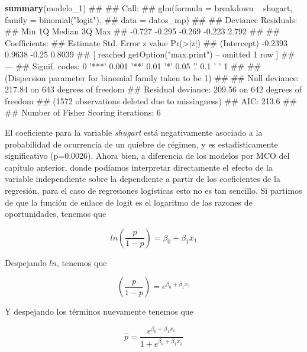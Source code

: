 \documentclass[]{book}
\newenvironment{Shaded}{\begin{snugshade}}{\end{snugshade}}
\newcommand{\KeywordTok}[1]{\textcolor[rgb]{0.13,0.29,0.53}{\textbf{#1}}}
\newcommand{\DecValTok}[1]{\textcolor[rgb]{0.00,0.00,0.81}{#1}}
\newcommand{\NormalTok}[1]{#1}
\begin{document}
\begin{Shaded}
\begin{Highlighting}[]
\KeywordTok{summary}\NormalTok{(modelo_}\DecValTok{1}\NormalTok{)}
\NormalTok{## }
\NormalTok{## Call:}
\NormalTok{## glm(formula = breakdown ~ shugart, family = binomial("logit"), }
\NormalTok{##     data = datos_mp)}
\NormalTok{## }
\NormalTok{## Deviance Residuals: }
\NormalTok{##    Min      1Q  Median      3Q     Max  }
\NormalTok{## -0.727  -0.295  -0.269  -0.223   2.792  }
\NormalTok{## }
\NormalTok{## Coefficients:}
\NormalTok{##             Estimate Std. Error z value Pr(>|z|)   }
\NormalTok{## (Intercept)  -0.2393     0.9638   -0.25   0.8039   }
\NormalTok{##  [ reached getOption("max.print") -- omitted 1 row ]}
\NormalTok{## ---}
\NormalTok{## Signif. codes:  0 '***' 0.001 '**' 0.01 '*' 0.05 '.' 0.1 ' ' 1}
\NormalTok{## }
\NormalTok{## (Dispersion parameter for binomial family taken to be 1)}
\NormalTok{## }
\NormalTok{##     Null deviance: 217.84  on 643  degrees of freedom}
\NormalTok{## Residual deviance: 209.56  on 642  degrees of freedom}
\NormalTok{##   (1572 observations deleted due to missingness)}
\NormalTok{## AIC: 213.6}
\NormalTok{## }
\NormalTok{## Number of Fisher Scoring iterations: 6}
\end{Highlighting}
\end{Shaded}

El coeficiente para la variable \emph{shugart} está negativamente
asociado a la probabilidad de ocurrencia de un quiebre de régimen, y es
estadísticamente significativo (p=0.0026). Ahora bien, a diferencia de
los modelos por MCO del capítulo anterior, donde podíamos interpretar
directamente el efecto de la variable independiente sobre la dependiente
a partir de los coeficientes de la regresión, para el caso de
regresiones logísticas esto no es tan sencillo. Si partimos de que la
función de enlace de logit es el logaritmo de las razones de
oportunidades, tenemos que

\[ln(\frac {p}{1 - p}) = \beta_{0} + \beta_{1}x_{1}
  \label{eq:bin-funenlace}\]

Despejando \(ln\), tenemos que

\[(\frac {p}{1 - p}) = e^{\beta_{0}+\beta_{1}x_{1}}
  \label{eq:bin-lndespejado} \]

Y despejando los términos nuevamente tenemos que

\[\hat{p} = \frac {e^{\beta_{0}+\beta_{1}x_{1}}}{1 + e^{\beta_{0}+\beta_{1}x_{1}}}
  \label{eq:bin-términosdespejados}\]
\end{document}
